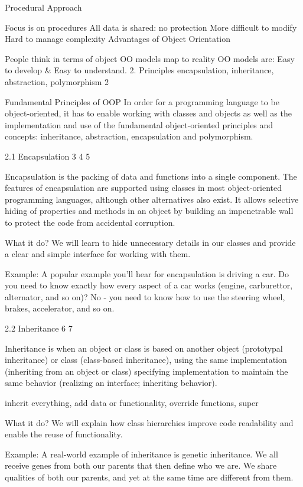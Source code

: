 Procedural Approach

Focus is on procedures
All data is shared: no protection
More difficult to modify
Hard to manage complexity
Advantages of Object Orientation

People think in terms of object
OO models map to reality
OO models are: Easy to develop & Easy to understand.
2. Principles
encapsulation, inheritance, abstraction, polymorphism 2

 Fundamental Principles of OOP In order for a programming language to be object-oriented, it has to enable working with classes and objects as well as the implementation and use of the fundamental object-oriented principles and concepts: inheritance, abstraction, encapsulation and polymorphism.

2.1 Encapsulation 3 4 5

Encapsulation is the packing of data and functions into a single component. The features of encapsulation are supported using classes in most object-oriented programming languages, although other alternatives also exist. It allows selective hiding of properties and methods in an object by building an impenetrable wall to protect the code from accidental corruption.

What it do? We will learn to hide unnecessary details in our classes and provide a clear and simple interface for working with them.



Example: A popular example you’ll hear for encapsulation is driving a car. Do you need to know exactly how every aspect of a car works (engine, carburettor, alternator, and so on)? No - you need to know how to use the steering wheel, brakes, accelerator, and so on.

2.2 Inheritance 6 7

Inheritance is when an object or class is based on another object (prototypal inheritance) or class (class-based inheritance), using the same implementation (inheriting from an object or class) specifying implementation to maintain the same behavior (realizing an interface; inheriting behavior).

inherit everything, add data or functionality, override functions, super

What it do? We will explain how class hierarchies improve code readability and enable the reuse of functionality.



Example: A real-world example of inheritance is genetic inheritance. We all receive genes from both our parents that then define who we are. We share qualities of both our parents, and yet at the same time are different from them.



